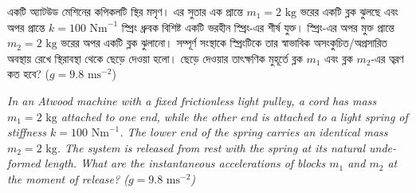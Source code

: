 \documentclass[12pt, a4paper]{article}
\begin{document}
\begin{tcolorbox}[questionbox={প্রশ্ন (Question) 8}]
\noindent
একটি অ্যাটউড মেশিনের কপিকলটি স্থির মসৃণ। এর সুতার এক প্রান্তে $m_1 = 2\text{ kg}$ ভরের একটি ব্লক ঝুলছে এবং অপর প্রান্তে $k = 100\text{ Nm}^{-1}$ স্প্রিং ধ্রুবক বিশিষ্ট একটি ভরহীন স্প্রিং-এর শীর্ষ যুক্ত। স্প্রিং-এর অপর মুক্ত প্রান্তে $m_2 = 2\text{ kg}$ ভরের অপর একটি ব্লক ঝুলানো। সম্পূর্ণ সংস্থাকে স্প্রিংটিকে তার স্বাভাবিক অসংকুচিত/অপ্রসারিত অবস্থায় রেখে স্থিরাবস্থা থেকে ছেড়ে দেওয়া হলো। ছেড়ে দেওয়ার তাৎক্ষণিক মুহূর্তে ব্লক $m_1$ এবং ব্লক $m_2$-এর ত্বরণ কত হবে? ($g = 9.8\text{ ms}^{-2}$)

\vspace{0.8em}
\begin{english}
\noindent\textit{\color{darkgray}
In an Atwood machine with a fixed frictionless light pulley, a cord has mass $m_1 = 2\text{ kg}$ attached to one end, while the other end is attached to a light spring of stiffness $k = 100\text{ Nm}^{-1}$. The lower end of the spring carries an identical mass $m_2 = 2\text{ kg}$. The system is released from rest with the spring at its natural undeformed length. What are the instantaneous accelerations of blocks $m_1$ and $m_2$ at the moment of release? ($g = 9.8\text{ ms}^{-2}$)
}
\end{english}
\end{tcolorbox}

\vspace{1em}
\begin{center}
\end{center}
\vspace{1em}
\end{document}
